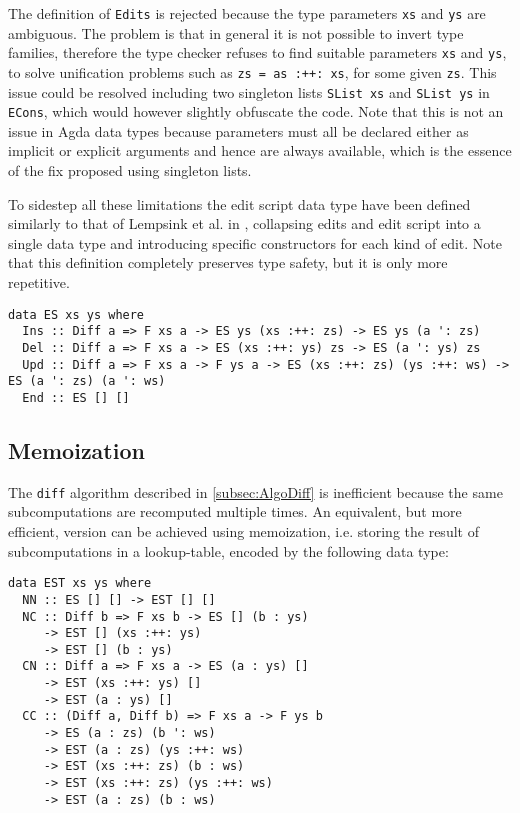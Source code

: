 \documentclass[../Thesis.tex]{subfiles}
\begin{document}
	The definition of \texttt{Edits} is rejected because the type parameters
	\texttt{xs} and \texttt{ys} are ambiguous. The problem is that 
	in general it is not possible to invert type families, therefore
	the type checker refuses to find suitable parameters \texttt{xs} and 
	\texttt{ys}, to solve unification problems such as \texttt{zs = as :++: xs},
	for some given \texttt{zs}. This issue could be resolved including
	two singleton lists \texttt{SList xs} and \texttt{SList ys} in \texttt{ECons},
	which would however slightly obfuscate the code.
	Note that this is not an issue in Agda data types because parameters
	must all be declared either as implicit or explicit arguments and 
	hence are always available, which is the essence of the fix proposed
	using singleton lists.	
	
	To sidestep all these limitations the edit script data type have been defined 
	similarly to that of Lempsink et al. in \cite{Lemp09}, 
	collapsing edits and edit script into
	a single data type and introducing specific constructors for
	each kind of edit. Note that this definition completely preserves type safety,
	but it is only more repetitive.

\begin{verbatim}
data ES xs ys where
  Ins :: Diff a => F xs a -> ES ys (xs :++: zs) -> ES ys (a ': zs)
  Del :: Diff a => F xs a -> ES (xs :++: ys) zs -> ES (a ': ys) zs
  Upd :: Diff a => F xs a -> F ys a -> ES (xs :++: zs) (ys :++: ws) -> ES (a ': zs) (a ': ws)
  End :: ES [] []
\end{verbatim}

	\subsection{Memoization}
	The \texttt{diff} algorithm described in \ref{subsec:AlgoDiff} is inefficient 
	because the same subcomputations are recomputed multiple times.
	An equivalent, but more efficient, version can be achieved using 
	memoization, i.e. storing the result of subcomputations in a lookup-table,
	encoded by the following data type:
	
\begin{verbatim}	
data EST xs ys where
  NN :: ES [] [] -> EST [] []
  NC :: Diff b => F xs b -> ES [] (b : ys) 
     -> EST [] (xs :++: ys) 
     -> EST [] (b : ys)
  CN :: Diff a => F xs a -> ES (a : ys) [] 
     -> EST (xs :++: ys) []
     -> EST (a : ys) []
  CC :: (Diff a, Diff b) => F xs a -> F ys b 
     -> ES (a : zs) (b ': ws) 
     -> EST (a : zs) (ys :++: ws)
     -> EST (xs :++: zs) (b : ws)
     -> EST (xs :++: zs) (ys :++: ws)
     -> EST (a : zs) (b : ws)
\end{verbatim}
	
\end{document}
